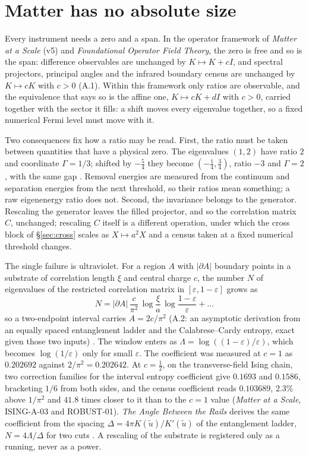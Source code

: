 \section{Matter has no absolute size}\label{sec:size}
Every instrument needs a zero and a span. In the operator framework of \emph{Matter at a Scale} (v5) and \emph{Foundational Operator Field Theory}, the zero is free and so is the span: difference observables are unchanged by $K\mapsto K+cI$, and spectral projectors, principal angles and the infrared boundary census are unchanged by $K\mapsto cK$ with $c>0$  (A.1). Within this framework only ratios are observable, and the equivalence that says so is the affine one, $K\mapsto cK+dI$ with $c>0$, carried together with the sector it fills: a shift moves every eigenvalue together, so a fixed numerical Fermi level must move with it.

Two consequences fix how a ratio may be read. First, the ratio must be taken between quantities that have a physical zero. The eigenvalues $(1,2)$ have ratio $2$ and coordinate $\Gamma=1/3$; shifted by $-\tfrac54$ they become $(-\tfrac14,\tfrac34)$, ratio $-3$ and $\Gamma=2$, with the same gap . Removal energies are measured from the continuum and separation energies from the next threshold, so their ratios mean something; a raw eigenenergy ratio does not. Second, the invariance belongs to the generator. Rescaling the generator leaves the filled projector, and so the correlation matrix $C$, unchanged; rescaling $C$ itself is a different operation, under which the cross block of §\ref{sec:cross} scales as $X\mapsto a^2X$ and a census taken at a fixed numerical threshold changes.

The single failure is ultraviolet. For a region $A$ with $|\partial A|$ boundary points in a substrate of correlation length $\xi$ and central charge $c$, the number $N$ of eigenvalues of the restricted correlation matrix in $[\varepsilon,1-\varepsilon]$ grows as
\begin{equation}
N=|\partial A|\,\frac{c}{\pi^2}\,\log\frac{\xi}{a}\,\log\frac{1-\varepsilon}{\varepsilon}+\dots
\label{eq:census}
\end{equation}
so a two-endpoint interval carries $A=2c/\pi^2$ (A.2: an asymptotic derivation from an equally spaced entanglement ladder and the Calabrese–Cardy entropy, exact given those two inputs) . The window enters as $\Lambda=\log((1-\varepsilon)/\varepsilon)$, which becomes $\log(1/\varepsilon)$ only for small $\varepsilon$. The coefficient was measured at $c=1$ as $0.202692$ against $2/\pi^2=0.202642$. At $c=\tfrac12$, on the transverse-field Ising chain, two correction families for the interval entropy coefficient give $0.1693$ and $0.1586$, bracketing $1/6$ from both sides, and the census coefficient reads $0.103689$, $2.3\%$ above $1/\pi^2$ and $41.8$ times closer to it than to the $c=1$ value  (\emph{Matter at a Scale}, ISING-A-03 and ROBUST-01). \emph{The Angle Between the Rails} derives the same coefficient from the spacing $\Delta=4\pi K(\tilde u)/K'(\tilde u)$ of the entanglement ladder, $N=4\Lambda/\Delta$ for two cuts . A rescaling of the substrate is registered only as a running, never as a power.

